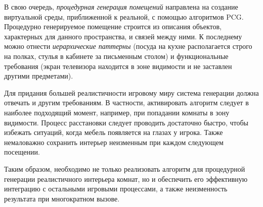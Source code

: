 В свою очередь, \textit{процедурная генерация помещений} направлена на создание виртуальной среды, приближенной к реальной, с помощью алгоритмов PCG. Процедурно генерируемое помещение строится из описания объектов, характерных для данного пространства, и связей между ними. К последнему можно отнести \textit{иерархические паттерны} (посуда на кухне располагается строго на полках, стулья в кабинете за письменным столом) и функциональные требования (экран телевизора находится в зоне видимости и не заставлен другими предметами).

Для придания большей реалистичности игровому миру система генерации должна отвечать и другим требованиям. В частности, активировать  алгоритм следует в наиболее подходящий момент, например, при попадании комнаты в зону видимости. Процесс расстановки следует проводить достаточно быстро, чтобы избежать ситуаций, когда мебель появляется на глазах у игрока. Также немаловажно сохранить интерьер неизменным при каждом следующем посещении.

Таким образом, необходимо не только реализовать алгоритм для процедурной генерации реалистичного интерьера комнат, но и обеспечить его эффективную интеграцию с остальными игровыми процессами, а также неизменность результата при многократном вызове.